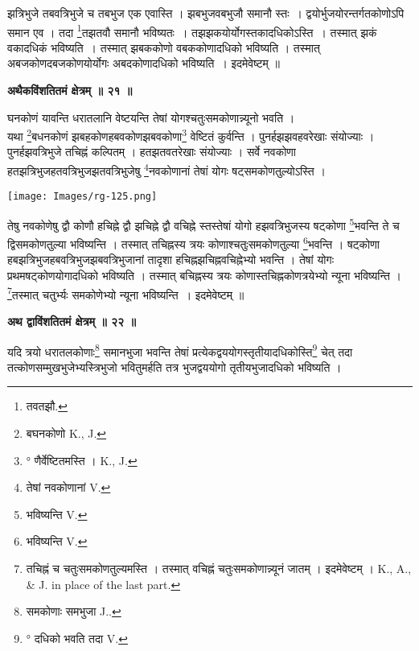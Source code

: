 \documentclass[11pt, openany]{book}
\begin{document}
    
\newpage

\noindent झत्रिभुजे तबवत्रिभुजे च तबभुज एक एवास्ति । झबभुजवबभुजौ समानौ स्तः~। द्वयोर्भुजयोरन्तर्गतकोणोऽपि समान एव । तदा \renewcommand{\thefootnote}{१}\footnote{तवतझौ.}तझतवौ समानौ भविष्यतः~। तझझकयोर्योगस्तकादधिकोऽस्ति~। तस्मात् झकं वकादधिकं भविष्यति~। तस्मात् झबककोणो वबककोणादधिको भविष्यति । तस्मात् अबजकोणदबजकोणयोर्योगः अबदकोणादधिको भविष्यति~। इदमेवेष्टम् ॥\\
\begin{center}
\textbf{\large अथैकविंशतितमं क्षेत्रम् ॥ २१ ॥}
\end{center}
\vspace{2mm}

{\ab घनकोणं यावन्ति धरातलानि वेष्टयन्ति तेषां योगश्चतुःसमकोणान्न्यूनो भवति ।}\\

 यथा \renewcommand{\thefootnote}{२}\footnote{बघनकोणो {\en K., J.} }बधनकोणं झबहकोणहबवकोणझबवकोणा\renewcommand{\thefootnote}{३}\footnote{° णैर्वेष्टितमस्ति । {\en K., J.}} वेष्टितं कुर्वन्ति । पुनर्हझझवहवरेखाः संयोज्याः । पुनर्हझवत्रिभुजे तचिह्नं कल्पितम् । हतझतवतरेखाः संयोज्याः । सर्वे नवकोणा
हतझत्रिभुजहतवत्रिभुजझतवत्रिभुजेषु \renewcommand{\thefootnote}{४}\footnote{तेषां नवकोणानां {\en V.} }नवकोणानां तेषां योगः षट्समकोणतुल्योऽस्ति । 
\begin{center}
\texttt{[image: Images/rg-125.png]}
\end{center}

तेषु नवकोणेषु द्वौ कोणौ हचिह्ने द्वौ झचिह्ने द्वौ
वचिह्ने स्तस्तेषां योगो हझवत्रिभुजस्य षट्कोणा \renewcommand{\thefootnote}{५}\footnote{भविष्यन्ति {\en V.}}भवन्ति ते च
द्विसमकोणतुल्या भविष्यन्ति । तस्मात् तचिह्नस्य त्रयः कोणाश्चतुःसमकोणतुल्या
\renewcommand{\thefootnote}{६}\footnote{भविष्यन्ति {\en V.} }भवन्ति । षट्कोणा हबझत्रिभुजहबवत्रिभुजझबवत्रिभुजानां तादृशा हचिह्नझचिह्नवचिह्नेभ्यो भवन्ति । तेषां योगः प्रथमषट्कोणयोगादधिको भविष्यति । तस्मात् बचिह्नस्य त्रयः कोणास्तचिह्नकोणत्रयेभ्यो न्यूना भविष्यन्ति । \renewcommand{\thefootnote}{७}\footnote{तचिह्नं च चतुःसमकोणतुल्यमस्ति । तस्मात् वचिह्नं चतुःसमकोणान्न्यूनं जातम् ।
इदमेवेष्टम् । {\en K., A., \& J. in place of the last part.}}तस्मात् चतुर्भ्यः समकोणेभ्यो न्यूना भविष्यन्ति~। इदमेवेष्टम् ॥

\newpage
\begin{center}
\textbf{\large अथ द्वाविंशतितमं क्षेत्रम् ॥ २२ ॥}
\end{center}
\vspace{5mm}

{\ab यदि त्रयो धरातलकोणाः\renewcommand{\thefootnote}{१}\footnote{समकोणाः समभुजा {\en J..}} समानभुजा भवन्ति तेषां प्रत्येकद्वययोगस्तृतीयादधिकोस्ति\renewcommand{\thefootnote}{२}\footnote{° दधिको भवति तदा {\en V.}} चेत् तदा तत्कोणसम्मुखभुजेभ्यस्त्रिभुजो भवितुमर्हति तत्र भुजद्वययोगो तृतीयभुजादधिको भविष्यति ।}\\
\vspace{3mm}
\end{document}
